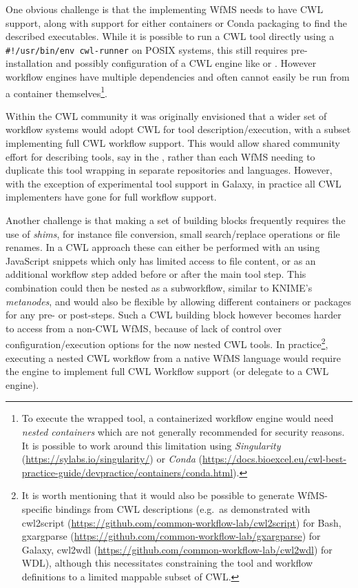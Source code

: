 One obvious challenge is that the implementing WfMS needs to have CWL
support, along with support for either containers or Conda packaging to
find the described executables. While it is possible to run a CWL tool
directly using a \texttt{\#!/usr/bin/env\ cwl-runner}
 on POSIX
systems, this still requires pre-installation and possibly configuration
of a CWL engine like 
or 
\cite{ch6-33}. However workflow engines have multiple dependencies and often
cannot easily be run from a container themselves\footnote{To execute the
  wrapped tool, a containerized workflow engine would need \emph{nested
  containers} which are not generally recommended for security reasons.
  It is possible to work around this limitation using
  \emph{Singularity} (\url{https://sylabs.io/singularity/}) or
  \emph{Conda} (\url{https://docs.bioexcel.eu/cwl-best-practice-guide/devpractice/containers/conda.html}).}.

Within the CWL community it was originally envisioned that a wider set
of workflow systems would adopt CWL for tool description/execution, with
a subset implementing full CWL workflow support. This would allow shared
community effort for describing tools, say in the
, rather than each WfMS needing to duplicate this tool wrapping
in separate repositories and languages. However, with the exception of
experimental tool support in Galaxy, in practice all CWL implementers
have gone for full workflow support.

Another challenge is that making a set of building blocks frequently
requires the use of \emph{shims}, for instance file conversion, small
search/replace operations or file renames. In a CWL approach these can
either be performed with an
using JavaScript snippets which only has limited access to file content,
or as an additional workflow step added before or after the main tool
step. This combination could then be nested as a subworkflow, similar to
KNIME's \emph{metanodes}, and would also be flexible by allowing
different containers or packages for any pre- or post-steps. Such a CWL
building block however becomes harder to access from a non-CWL WfMS,
because of lack of control over configuration/execution options for the
now nested CWL tools. In practice\footnote{It is worth mentioning that
  it would also be possible to generate WfMS-specific bindings from CWL
  descriptions (e.g.~as demonstrated with cwl2script 
  (\url{https://github.com/common-workflow-lab/cwl2script})
  for Bash, gxargparse
  (\url{https://github.com/common-workflow-lab/gxargparse})
  for Galaxy, cwl2wdl
  (\url{https://github.com/common-workflow-lab/cwl2wdl}) for
  WDL), although this necessitates constraining the tool and workflow
  definitions to a limited mappable subset of CWL.}, executing a nested
CWL workflow from a native WfMS language would require the engine to
implement full CWL Workflow support (or delegate to a CWL engine).

